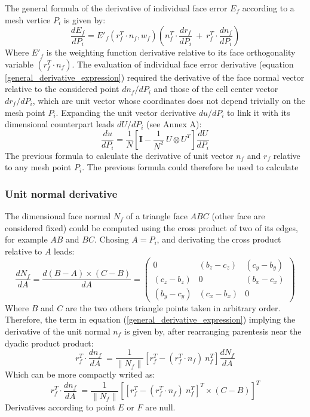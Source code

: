 \documentclass[11pt]{article}
\begin{document}
The general formula of the derivative of individual face error $E_f$ according to a mesh vertice $P_i$ is given by:
%
\begin{equation}
\frac{dE_f}{dP_i} = E'_f\left( r_f^T \cdot n_f, w_f \right) \left(n_f^T \cdot \frac{d r_f}{dP_i}\ +\ r_f^T \cdot \frac{d n_f}{dP_i}\right)
\label{general_derivative_expression}
\end{equation}
%
Where $E'_f$ is the weighting function derivative relative to its face orthogonality variable $(r_f^T \cdot n_f)$.
The evaluation of individual face error derivative (equation \ref{general_derivative_expression}) required the derivative of the face normal vector relative to the considered point $d n_f / dP_i$ and those of the cell center vector $d r_f / dP_i$, which are unit vector whose coordinates does not depend trivially on the mesh point $P_i$.
Expanding the unit vector derivative $du/dP_i$ to link it with its dimensional counterpart leads $dU/dP_i$ (see Annex A):
%
\begin{equation}
\frac{du}{dP_i} = \frac{1}{N} \left[ \boldsymbol{I} - \frac{1}{N^2}\ U \otimes U^T \right] \frac{dU}{dP_i}
\end{equation}
%
The previous formula to calculate the derivative of unit vector $n_f$ and $r_f$ relative to any mesh point $P_i$.
The previous formula could therefore be used to calculate 

\subsubsection{Unit normal derivative}

The dimensional face normal $N_f$ of a triangle face $ABC$ (other face are considered fixed) could be computed using the cross product of two of its edges, for example $AB$ and $BC$.
Chosing $A = P_i$, and derivating the cross product relative to $A$ leads:
%
\begin{equation}
\frac{d N_f}{dA} = \frac{d (B-A) \times (C-B)}{dA} = \begin{pmatrix}
0 & (b_z-c_z) & (c_y-b_y) \\
(c_z-b_z) & 0 & (b_x-c_x) \\
(b_y-c_y) & (c_x-b_x) & 0
\end{pmatrix} 
\end{equation}
%
Where $B$ and $C$ are the two others triangle points taken in arbitrary order.
Therefore, the term in equation (\ref{general_derivative_expression}) implying the derivative of the unit normal $n_f$ is given by, after rearranging parentesis near the dyadic product product:
\begin{equation}
r_f^T\cdot \frac{d n_f}{dA}\ = 
 \frac{1}{\| N_f \|} \left[ r_f^T -  (r_f^T \cdot n_f)\ n_f^T \right] \frac{d N_f}{dA}
 \label{deriv_n_f}
\end{equation}
%
Which can be more compactly writed as:
%
\begin{equation}
r_f^T\cdot \frac{d n_f}{dA}\ = 
 \frac{1}{\| N_f \|} \left[ \left[ r_f^T -  (r_f^T \cdot n_f)\ n_f^T \right]^T \times (C-B) \right]^T
\end{equation}
%
Derivatives according to point $E$ or $F$ are null.
\end{document}
